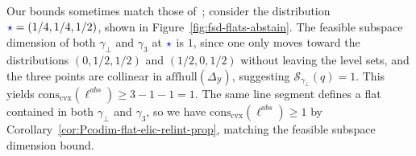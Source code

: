 \documentclass[anon,12pt]{colt2021} %
\newcommand{\simplex}{\Delta_\Y}
\newcommand{\conscvx}{\mathrm{cons}_\mathrm{cvx}}
\newcommand{\affhull}{\mathrm{affhull}}
\newcommand{\Sc}{\mathcal{S}}  %
\newcommand{\Y}{\mathcal{Y}}
\begin{document}
Our bounds sometimes match those of~\citep{ramaswamy2016convex}; consider the distribution ${\color{blue}\star} = (1/4, 1/4, 1/2)$, shown in Figure~\ref{fig:fsd-flats-abstain}.
The feasible subspace dimension of both $\gamma_\bot$ and $\gamma_3$ at ${\color{blue}\star}$ is $1$, since one only moves toward the distributions $(0,1/2, 1/2)$ and $(1/2, 0, 1/2)$ without leaving the level sets, and the three points are collinear in $\affhull(\simplex)$, suggesting $\Sc_{\gamma_\bot}(q) = 1$.  
This yields $\conscvx(\ell^{abs}) \geq 3 - 1- 1 = 1$.
The same line segment defines a flat contained in both $\gamma_\bot$ and $\gamma_3$, so we have $\conscvx(\ell^{abs}) \geq 1$ by Corollary~\ref{cor:Pcodim-flat-elic-relint-prop}, matching the feasible subspace dimension bound.


\end{document}
